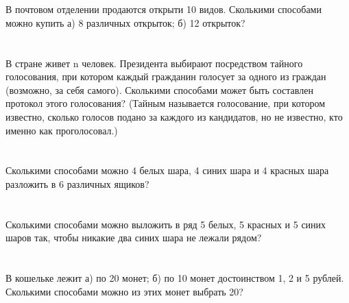\documentclass{article}%
\begin{document}
%
\section{}%
\label{sec:}%
В почтовом отделении продаются открыти 10 видов. Сколькими способами
можно купить а) 8 различных открыток; б) 12 открыток?%
%
\iffalse%
Автор: Дмитрий Трущин%
Дата: 01{-}10{-}2013%
Название: None%
Подсказка: \textbackslash{}\textbackslash{}%
nan%
\fi

%
\section{}%
\label{sec:}%
В стране живет n человек. Президента выбирают посредством тайного
голосования, при котором каждый гражданин голосует за одного из граждан
(возможно, за себя самого). Сколькими способами может быть составлен протокол
этого голосования? (Тайным называется голосование, при котором известно, сколько
голосов подано за каждого из кандидатов, но не известно, кто именно как
проголосовал.)%
%
\iffalse%
Автор: Дмитрий Трущин%
Дата: 01{-}10{-}2013%
Название: None%
Подсказка: \textbackslash{}\textbackslash{}%
nan%
\fi

%
\section{}%
\label{sec:}%
Сколькими способами можно 4 белых шара, 4 синих шара и 4 красных шара
разложить в 6 различных ящиков?%
%
\iffalse%
Автор: Дмитрий Трущин%
Дата: 01{-}10{-}2013%
Название: None%
Подсказка: \textbackslash{}\textbackslash{}%
nan%
\fi

%
\section{}%
\label{sec:}%
Сколькими способами можно выложить в ряд 5 белых, 5 красных и 5 синих
шаров так, чтобы никакие два синих шара не лежали рядом?%
%
\iffalse%
Автор: Дмитрий Трущин%
Дата: 01{-}10{-}2013%
Название: None%
Подсказка: \textbackslash{}\textbackslash{}%
nan%
\fi

%
\section{}%
\label{sec:}%
В кошельке лежит а) по 20 монет; б) по 10 монет достоинством 1, 2 и 5 рублей.
Сколькими способами можно из этих монет выбрать 20?%
%
\iffalse%
Автор: Дмитрий Трущин%
Дата: 01{-}10{-}2013%
Название: None%
Подсказка: \textbackslash{}\textbackslash{}%
nan%
\fi
\end{document}

